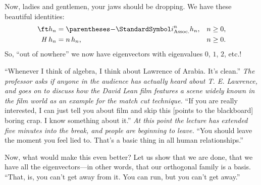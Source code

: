 \documentclass[10pt, a4paper, twoside]{lecturenotes}
\begin{document}
Now, ladies and gentlemen, your jaws should be dropping. We have these beautiful identities:
\begin{align*}
  \ft h_n &= \pa{-\I}^n h_n \text, && n \geq 0 \text,\\
  \opH h_n &= n\, h_n\text, && n \geq 0 \text.
\end{align*}
So, ``out of nowhere'' we now have eigenvectors with eigenvalues $0$, $1$, $2$, etc.!

``Whenever I think of algebra, I think about Lawrence of Arabia. It's clean.'' \emph{The professor asks if anyone in the audience has actually heard about T. E. Lawrence, and goes on to discuss how the David Lean film features a scene widely known in the film world as an example for the match cut technique.} ``If you are really interested, I can just tell you about film and skip this [points to the blackboard] boring crap. I know something about it.'' \emph{At this point the lecture has extended five minutes into the break, and people are beginning to leave.}
``You should leave the moment you feel lied to. That's a basic thing in all human relationships.''

Now, what would make this even better? Let us show that we are done, that we have all the eigenvectors---in other words, that our orthogonal family is a basis. ``That, is, you can't get away from it. You can run, but you can't get away.''
\end{document}
